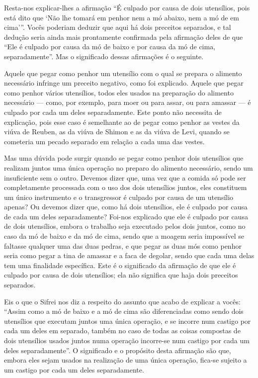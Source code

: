 Resta-nos explicar-lhes a afirmação ``É culpado por causa de dois
utensílios, pois está dito que `Não lhe tomará em penhor nem a mó
abaixo, nem a mó de em cima'''. Vocês poderiam deduzir que aqui há dois
preceitos separados, e tal dedução seria ainda mais prontamente
confirmada pela afirmação deles de que ``Ele é culpado por causa da mó
de baixo e por causa da mó de cima, separadamente''. Mas o significado
dessas afirmações é o seguinte.

Aquele que pegar como penhor um utensílio com o qual se prepara o
alimento necessário infringe um preceito negativo, como foi explicado.
Aquele que pegar como penhor vários utensílios, todos eles usados na
preparação do alimento necessário --- como, por exemplo, para moer ou
para assar, ou para amassar --- é culpado por cada um deles
separadamente. Este ponto não necessita de explicação, pois esse caso é
semelhante ao de pegar como penhor as vestes da viúva de Reuben, as da
viúva de Shimon e as da viúva de Levi, quando se cometeria um pecado
separado em relação a cada uma das vestes.

Mas uma dúvida pode surgir quando se pegar como penhor dois utensílios
que realizam juntos uma única operação no preparo do alimento
necessário, sendo um insuficiente sem o outro. Devemos dizer que, uma
vez que a comida só pode ser completamente processada com o uso dos
dois utensílios juntos, eles constituem um único instrumento e o
transgressor é culpado por causa de um utensílio apenas? Ou devemos
dizer que, como há dois utensílios, ele é culpado por causa de cada um
deles separadamente? Foi-nos explicado que ele é culpado por causa de
dois utensílios, embora o trabalho seja executado pelos dois juntos,
como no caso da mó de baixo e da mó de cima, sendo que a moagem seria
impossível se faltasse qualquer uma das duas pedras, e que pegar as
duas mós como penhor seria como pegar a tina de amassar e a faca de
degolar, sendo que cada uma delas tem uma finalidade específica. Este é
o significado da afirmação de que ele é culpado por causa de dois
utensílios; ela não significa que haja dois preceitos separados.

Eis o que o Sifrei nos diz a respeito do assunto que acabo de explicar
a vocês: ``Assim como a mó de baixo e a mó de cima são diferenciadas
como sendo dois utensílios que executam juntos uma única operação, e se
incorre num castigo por cada um deles em separado, também no caso de
todas as coisas compostas de dois utensílios usados juntos numa
operação incorre-se num castigo por cada um deles separadamente''. O
significado e o propósito desta afirmação são que, embora eles sejam
usados na realização de uma única operação, fica-se sujeito a um castigo
por cada um deles separadamente.

